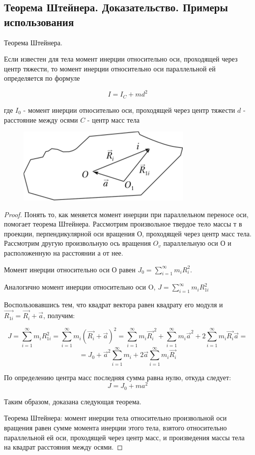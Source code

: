 \subsection{Теорема Штейнера. Доказательство. Примеры использования}

\begin{theorem}
    Теорема Штейнера.

    Если известен для тела момент инерции относительно оси, проходящей через центр тяжести, то момент инерции относительно оси параллельной ей определяется по формуле

    $$I=I_C+md^2$$

    где $I_0$ - момент инерции относительно оси, проходящей через центр тяжести
    $d$ - расстояние между осями
    $C$ - центр масс тела
\end{theorem}

\begin{figure}[h]
    \centering
    \includegraphics[width=0.5\linewidth]{imgs/q10i2.png}
\end{figure}

\begin{proof}
    Понять то, как меняется момент инерции при параллельном переносе оси, помогает теорема Штейнера. 
Рассмотрим произвольное твердое тело массы т в проекции, перпендикулярной оси вращения О, 
проходящей через центр масс тела. Рассмотрим другую произвольную ось вращения $O_v$ параллельную оси О 
и расположенную на расстоянии а от нее.

Момент инерции относительно оси О равен $J_0 = \sum\limits_{i=1}^\infty m_iR_i^2$.

Аналогично момент инерции относительно оси O, $J = \sum\limits_{i=1}^\infty m_iR_{1i}^2$

Воспользовавшись тем, что квадрат вектора равен квадрату его модуля и $\vec{R_{1i}}=\vec{R_i} + \vec{a}$, получим:

$$J 
= \sum\limits_{i=1}^\infty m_iR_{1i}^2 
= \sum\limits_{i=1}^\infty m_i(\vec{R_{i}} + \vec{a})^2
= \sum\limits_{i=1}^\infty m_i\vec{R_{i}}^2 + \sum\limits_{i=1}^\infty m_i\vec{a}^2 + 2\sum\limits_{i=1}^\infty m_i\vec{R_{i}}\vec{a} 
= 
$$
$$
= J_0 + \vec{a}^2\sum\limits_{i=1}^\infty m_i + 2\vec{a}\sum\limits_{i=1}^\infty m_i \vec{R_i}
$$

По определению центра масс последняя сумма равна нулю, откуда следует: 
$$J = J_0 + ma^2$$

Таким образом, доказана следующая теорема.

Теорема Штейнера: момент инерции тела относительно произвольной оси вращения равен сумме момента инерции этого тела, 
взятого относительно параллельной ей оси, проходящей через центр масс, и произведения массы тела на квадрат расстояния 
между осями.
\end{proof}

